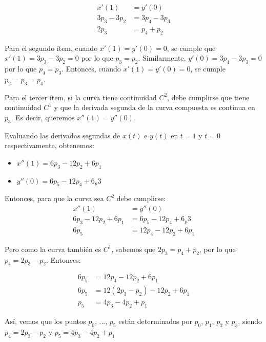 \documentclass{article}
\begin{document}
$$
\begin{aligned}
x'(1) &= y'(0) \\
3p_3 - 3p_2 &= 3p_4 - 3p_3 \\
2p_3 &= p_4 +p_2
\end{aligned}
$$

Para el segundo ítem, cuando $x'(1) = y'(0) = 0$, se cumple que $x'(1) = 3p_3 - 3p_2 = 0$ por lo que $p_3 = p_2$. Similarmente, $y'(0) = 3p_4 - 3p_3 = 0$ por lo que $p_4 = p_3$. Entonces, cuando $x'(1) = y'(0) = 0$, se cumple $p_2 = p_3 = p_4$.

Para el tercer ítem, si la curva tiene continuidad $C^2$, debe cumplirse que tiene continuidad $C^1$ y que la derivada segunda de la curva compuesta es continua en $p_3$. Es decir, queremos $x''(1) = y''(0)$.

Evaluando las derivadas segundas de $x(t)$ e $y(t)$ en $t = 1$ y $t=0$ respectivamente, obtenemos:
\begin{itemize}
    \item $x''(1) = 6p_3 -12p_2 + 6p_1$
    \item $y''(0) = 6p_5 -12p_4 + 6_p3$
\end{itemize}

Entonces, para que la curva sea $C^2$ debe cumplirse:
$$
\begin{aligned}
x''(1) &= y''(0) \\
6p_3 -12p_2 + 6p_1 &= 6p_5 -12p_4 + 6_p3 \\
6p_5 &= 12p_4-12p_2+6p_1
\end{aligned}
$$

Pero como la curva también es $C^1$, sabemos que $2p_3 = p_4 +p_2$, por lo que $p_4 = 2p_3-p_2$. Entonces:

$$
\begin{aligned}
6p_5 &= 12p_4-12p_2+6p_1 \\
6p_5 &= 12(2p_3-p_2)-12p_2+6p_1 \\
p_5 &= 4p_3 - 4p_2 +p_1
\end{aligned}
$$

Así, vemos que los puntos $p_0$, ..., $p_5$ están determinados por $p_0$, $p_1$, $p_2$ y $p_3$, siendo  $p_4 = 2p_3-p_2$ y $p_5 = 4p_3 - 4p_2 +p_1$
\end{document}
